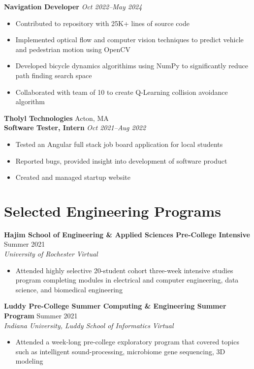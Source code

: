 \documentclass[letterpaper,10pt]{article}
\newcommand{\company}[2]{
    \vspace{6pt}
    {\large \textbf{#1}}
    \hfill
    {\normalsize {#2}}
    \\
}
\newcommand{\position}[2]{
    \vspace{4pt}
    {\normalsize \textbf {#1}}
    \hfill
    {\normalsize \textit{#2}}
    \\
}
\newcommand{\resumeEntry}[4]{
    \vspace{4pt}
    {\large \textbf{#1}}
    \hfill
    {\normalsize #2}
    \\
    \textit{#3} \hfill \textit{#4}
    \vspace{1pt}
}
\newcommand{\itemsBegin}{
    \begin{itemize}[leftmargin=0.2in, labelsep=0.05in, itemsep=0pt, parsep=1pt, topsep=0pt, partopsep=0pt]
}
\newcommand{\itemsEnd}{\end{itemize}}
\begin{document}
    \position{Navigation Developer}{Oct 2022--May 2024}
    \itemsBegin{}
        \item Contributed to repository with 25K+ lines of source code
        \item Implemented optical flow and computer vision techniques to predict vehicle and pedestrian motion using OpenCV
        \item Developed bicycle dynamics algorithims using NumPy to significantly reduce path finding search space
        \item Collaborated with team of 10 to create Q-Learning collision avoidance algorithm
    \itemsEnd{}

    \company{Tholyl Technologies}{Acton, MA}

    \position{Software Tester, Intern}{Oct 2021--Aug 2022}
    \itemsBegin
        \item Tested an Angular full stack job board application for local students
        \item Reported bugs, provided insight into development of software product
        \item Created and managed startup website
    \itemsEnd


\section{Selected Engineering Programs}


    \resumeEntry{Hajim School of Engineering \& Applied Sciences Pre-College Intensive}
        {Summer 2021}
        {University of Rochester}
        {Virtual}

    \itemsBegin{}
        \item Attended highly selective 20-student cohort three-week intensive studies program completing modules in electrical and computer engineering, data science, and biomedical engineering
    \itemsEnd{}

    \resumeEntry{Luddy Pre-College Summer Computing \& Engineering Summer Program}
        {Summer 2021}
        {Indiana University, Luddy School of Informatics}
        {Virtual}

    \itemsBegin{}
        \item Attended a week-long pre-college exploratory program that covered topics such as intelligent sound-processing, microbiome gene sequencing, 3D modeling
    \itemsEnd{}
\end{document}
